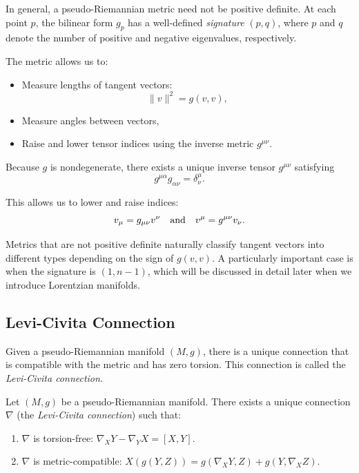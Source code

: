 In general, a pseudo-Riemannian metric need not be positive definite. At each point $p$, the bilinear form $g_p$ has a well-defined \emph{signature} $(p, q)$, where $p$ and $q$ denote the number of positive and negative eigenvalues, respectively.

The metric allows us to:

\begin{itemize}
  \item Measure lengths of tangent vectors:
    \[%
      \|v\|^2 = g(v,v)
    ,\]%
  \item Measure angles between vectors,
  \item Raise and lower tensor indices using the inverse metric $g^{\mu\nu}$.
\end{itemize}

Because $g$ is nondegenerate, there exists a unique inverse tensor $g^{\mu\nu}$ satisfying
\[%
  g^{\mu\alpha} g_{\alpha\nu} = \delta^\mu_{\nu}
.\]%

This allows us to lower and raise indices:
\[%
  v_\mu = g_{\mu\nu} v^\nu \aand v^\mu = g^{\mu\nu} v_\nu
.\]%

Metrics that are not positive definite naturally classify tangent vectors into different types depending on the sign of $g(v, v)$. A particularly important case is when the signature is $(1, n-1)$, which will be discussed in detail later when we introduce Lorentzian manifolds.

\subsection{Levi-Civita Connection}
\label{sub_sec:levi_civita_connection}

Given a pseudo-Riemannian manifold $(M, g)$, there is a unique connection that is compatible with the metric and has zero torsion. This connection is called the \emph{Levi-Civita connection}.

\begin{theorem}
  Let $(M, g)$ be a pseudo-Riemannian manifold. There exists a unique connection $\nabla$ (the \emph{Levi-Civita connection}) such that:
  \begin{enumerate}
    \item $\nabla$ is torsion-free: $\nabla_X Y - \nabla_Y X = [X,Y]$.
    \item $\nabla$ is metric-compatible: $X(g(Y,Z)) = g(\nabla_X Y, Z) + g(Y, \nabla_X Z)$.
  \end{enumerate}
\end{theorem}

